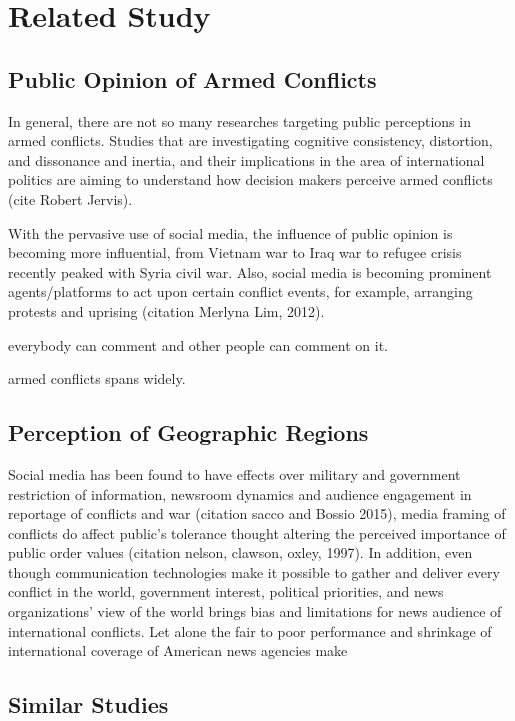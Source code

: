 \section{Related Study}
\subsection{Public Opinion of Armed Conflicts}
In general, there are not so many researches targeting public perceptions in armed conflicts. Studies that are investigating cognitive consistency, distortion, and dissonance and inertia, and their implications in the area of international politics are aiming to understand how decision makers perceive armed conflicts (cite Robert Jervis). 

With the pervasive use of social media, the influence of public opinion is becoming more influential, from Vietnam war to Iraq war to refugee crisis recently peaked with Syria civil war. Also, social media is becoming prominent agents/platforms to act upon certain conflict events, for example, arranging protests and uprising (citation Merlyna Lim, 2012).

everybody can comment and other people can comment on it.

armed conflicts spans widely.

\subsection{Perception of Geographic Regions}
Social media has been found to have effects over military and government restriction of information, newsroom dynamics and audience engagement in reportage of conflicts and war (citation sacco and Bossio 2015), media framing of conflicts do affect public's tolerance thought altering the perceived importance of public order values (citation nelson, clawson, oxley, 1997).  In addition, even though communication technologies make it possible to gather and deliver every conflict in the world, government interest, political priorities, and news organizations' view of the world brings bias and limitations for news audience of international conflicts. Let alone the fair to poor performance and shrinkage of international coverage of American news agencies make 



\subsection{Similar Studies}



